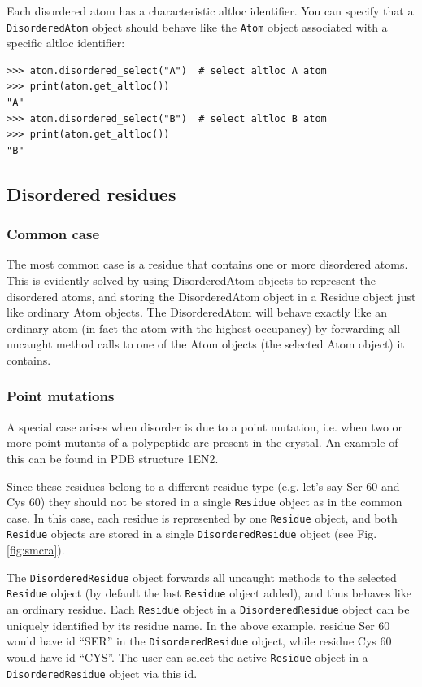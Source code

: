 Each disordered atom has a characteristic altloc identifier. You can
specify that a \texttt{Disordered\-Atom} object should behave like
the \texttt{Atom} object associated with a specific altloc identifier:

\begin{verbatim}
>>> atom.disordered_select("A")  # select altloc A atom
>>> print(atom.get_altloc())
"A"
>>> atom.disordered_select("B")  # select altloc B atom
>>> print(atom.get_altloc())
"B"
\end{verbatim}

\subsection{Disordered residues}

\subsubsection*{Common case}

The most common case is a residue that contains one or more disordered atoms.
This is evidently solved by using DisorderedAtom objects to represent the disordered
atoms, and storing the DisorderedAtom object in a Residue object just like ordinary
Atom objects. The DisorderedAtom will behave exactly like an ordinary atom (in
fact the atom with the highest occupancy) by forwarding all uncaught method
calls to one of the Atom objects (the selected Atom object) it contains.

\subsubsection*{Point mutations}
\label{sec:point_mutations}

A special case arises when disorder is due to a point mutation, i.e. when two
or more point mutants of a polypeptide are present in the crystal. An example
of this can be found in PDB structure 1EN2.

Since these residues belong to a different residue type (e.g. let's
say Ser 60 and Cys 60) they should not be stored in a single \texttt{Residue}
object as in the common case. In this case, each residue is represented
by one \texttt{Residue} object, and both \texttt{Residue} objects
are stored in a single \texttt{Disordered\-Residue} object (see Fig.
\ref{fig:smcra}).

The \texttt{Dis\-ordered\-Residue} object forwards all un\-caught methods to
the selected \texttt{Residue} object (by default the last \texttt{Residue}
object added), and thus behaves like an ordinary residue. Each
\texttt{Residue} object in a \texttt{Disordered\-Residue} object can be
uniquely identified by its residue name. In the above example, residue Ser 60
would have id ``SER'' in the \texttt{Disordered\-Residue} object, while
residue Cys 60 would have id ``CYS''. The user can select the active
\texttt{Residue} object in a \texttt{Disordered\-Residue} object via this id.

